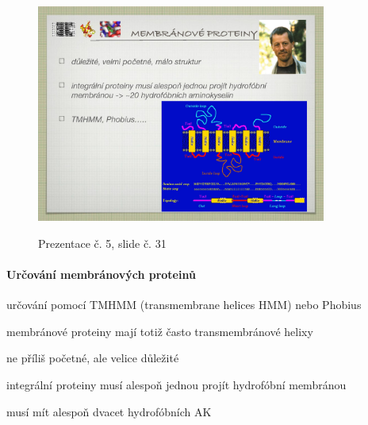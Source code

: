\documentclass[DIV=8]{scrreprt}
\begin{document}
\begin{figure}
    \caption{Prezentace č. 5, slide č. 31}
    \includegraphics[width=0.85\textwidth]{slides-5/slide-31.jpg}
    \centering
    \label{slides-5-slide-31}
\end{figure}

\paragraph{Určování membránových proteinů}
\begin{myItemize}[nosep]
    \item určování pomocí TMHMM (transmembrane helices HMM) nebo Phobius
\begin{myItemize}[nosep]
    \item membránové proteiny mají totiž často transmembránové helixy
\end{myItemize}

    \item ne příliš početné, ale velice důležité
    \item integrální proteiny musí alespoň jednou projít hydrofóbní membránou
\begin{myItemize}[nosep]
    \item musí mít alespoň dvacet hydrofóbních AK
\end{myItemize}

\end{myItemize}
\end{document}
